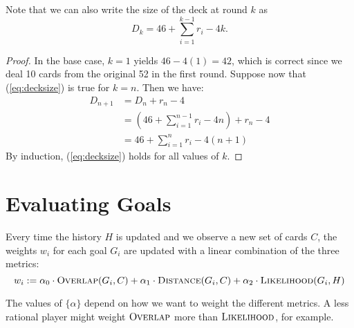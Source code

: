 \documentclass[11pt]{article}
\newcommand{\dist}{\textsc{Distance}}
\newcommand{\overlap}{\textsc{Overlap}}
\newcommand{\lkhd}{\textsc{Likelihood}}
\begin{document}
Note that we can also write the size of the deck at round $k$ as
\begin{equation}
  D_k = 46 + \sum_{i=1}^{k-1} r_i - 4k.
\label{eq:decksize} \end{equation}

\begin{proof}
  In the base case, $k=1$ yields $46-4(1) = 42$, which is correct since we deal 10 cards from the original 52 in the first round. Suppose now that (\ref{eq:decksize}) is true for $k=n$. Then we have:
    \begin{align}
      D_{n+1} &= D_n + r_n - 4 \\
      &= (46 + \sum_{i=1}^{n-1} r_i - 4n) + r_n - 4 \\
      &= 46 + \sum_{i=1}^n r_i - 4(n+1)
    \end{align}
  By induction, (\ref{eq:decksize}) holds for all values of $k$.
\end{proof}

\section{Evaluating Goals}

Every time the history $H$ is updated and we observe a new set of cards $C$, the weights $w_i$ for each goal $G_i$ are updated with a linear combination of the three metrics:
\begin{equation}
  w_i := \alpha_0 \cdot \overlap(G_i,C) + \alpha_1 \cdot \dist(G_i,C) + \alpha_2 \cdot \lkhd(G_i,H)
\label{eq:w-update} \end{equation}

The values of $\{\alpha\}$ depend on how we want to weight the different metrics. A less rational player might weight $\overlap$ more than $\lkhd$, for example.
\end{document}
